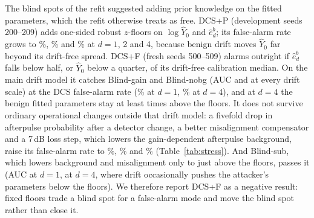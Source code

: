 The blind spots of the refit suggested adding prior knowledge on the fitted parameters, which the refit otherwise treats as free. DCS+P (development seeds 200--209) adds one-sided robust $z$-floors on $\log\hat Y_0$ and $\hat e_d^b$; its false-alarm rate grows to \exPFprVarDOne\%, \exPFprVarDTwo\% and \exPFprVarDFour\% at $d=1$, 2 and 4, because benign drift moves $\hat Y_0$ far beyond its drift-free spread. DCS+F (fresh seeds 500--509) alarms outright if $\hat e_d^b$ falls below half, or $\hat Y_0$ below a quarter, of its drift-free calibration median. On the main drift model it catches Blind-gain and Blind-nobg (AUC \exFGainVarDOne{} and \exFNodarkVarDOne{} at every drift scale) at the DCS false-alarm rate (\exFFprVarDOne\% at $d=1$, \exFFprVarDFour\% at $d=4$), and at $d=4$ the benign fitted parameters stay at least \stressMarginYzero{} times above the floors. It does not survive ordinary operational changes outside that drift model: a fivefold drop in afterpulse probability after a detector change, a better misalignment compensator and a 7\,dB loss step, which lowers the gain-dependent afterpulse background, raise its false-alarm rate to \stressApF\%, \stressCompF\% and \stressLossF\% (Table~\ref{tab:stress}). And Blind-sub, which lowers background and misalignment only to just above the floors, passes it (AUC \exFSubVarDOne{} at $d=1$, \exFSubVarDFour{} at $d=4$, where drift occasionally pushes the attacker's parameters below the floors). We therefore report DCS+F as a negative result: fixed floors trade a blind spot for a false-alarm mode and move the blind spot rather than close it.

\begin{table}[t]
\centering
\caption{One-factor sensitivity (ten seeds per row, 24-hour streams; nominal setting as in Table~\ref{tab:params}: 10\,s windows, 50\,km, $\sigma_I=1\%$, $p_{\rm ap}=1\%$, $(e^Z_{\rm mis},e^X_{\rm mis})=(1.0\%,1.2\%)$, intensity drift 1\%, $\sigma_M=0.2\%$, no monitor bias, path efficiency 0.5\%, PDL 0.25\%, misalignment growth 1\%/h). FPR at $\alpha=0.1\%$; TPR at $d=1$; ``Viol.\ nom.'': honest blocks at $d=1$ (of \sensNblocks) in which $s_{Z,1}$ with nominal intensities exceeded the true count.}\label{tab:sens}
\scriptsize\setlength{\tabcolsep}{2pt}\resizebox{\linewidth}{!}{}
\end{table}
